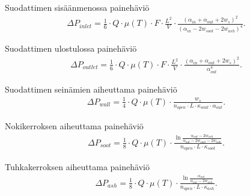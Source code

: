 Suodattimen sisäänmenossa painehäviö
\begin{align}
    \Delta P_{inlet} = \frac{1}{6} \cdot
    Q \cdot \mu(T) 
    \cdot F \cdot \frac{L^2}{V} \cdot \frac{(\alpha_{in}+\alpha_{out}+2 w_s)^2}{(\alpha_{in}-2w_{soot}-2w_{ash})^4}.
    \label{eq:PDinletchannel}
\end{align}

Suodattimen ulostulossa painehäviö
\begin{align}
    \Delta P_{outlet} = \frac{1}{6} \cdot
    Q \cdot \mu(T) 
    \cdot F \cdot \frac{L^2}{V} \cdot \frac{(\alpha_{in}+\alpha_{out}+2 w_s)^2}{\alpha_{out}^4}.
    \label{eq:PDoutletopen}
\end{align}

Suodattimen seinämien aiheuttama painehäviö 
\begin{align}
    \Delta P_{wall} = \frac{1}{4} \cdot
    Q \cdot \mu(T) 
    \cdot \frac{w_s}
    {n_{open}\cdot L \cdot \kappa_{wall} \cdot \alpha_{out}}.
    \label{eq:PDfilterwall}
\end{align}

Nokikerroksen aiheuttama painehäviö
\begin{align}
    \Delta P_{soot} =  \frac{1}{8} \cdot
    Q \cdot \mu(T) \cdot 
    \frac{\ln{\frac{\alpha_{out}-2w_{ash}}{\alpha_{out}-2w_{soot}-2w_{ash}}}}
    {n_{open}\cdot L \cdot \kappa_{soot}}.
    \label{eq:PDsootlayer}
\end{align}

Tuhkakerroksen aiheuttama painehäviö
\begin{align}
    \Delta P_{ash} = \frac{1}{8} \cdot
    Q \cdot \mu(T) \cdot 
    \frac{\ln{\frac{\alpha_{out}}{\alpha_{out}-2w_{ash}}}}
    {n_{open}\cdot L \cdot \kappa_{ash}}.
    \label{eq:PDashlayer}
\end{align}
